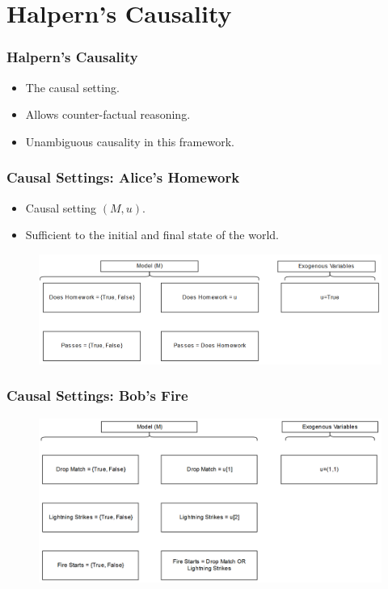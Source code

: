 \documentclass{beamer}
\theoremstyle{plain}
\theoremstyle{definition}
\begin{document}

\section{Halpern's Causality}


\begin{frame}
\frametitle{Halpern's Causality}

\begin{itemize}
\item The causal setting.
\item Allows counter-factual reasoning.
\item Unambiguous causality in this framework.

\end{itemize}

\end{frame}

\begin{frame}
\frametitle{Causal Settings: Alice's Homework}
\begin{itemize}
\item Causal setting $(M,u)$.
\item Sufficient to the initial and final state of the world.

\end{itemize}

\begin{figure}
\includegraphics[scale=0.3]{alicemodel}
\end{figure}
\end{frame}

\begin{frame}
\frametitle{Causal Settings: Bob's Fire}
\begin{figure}
\includegraphics[scale=0.3]{fireModel}
\end{figure}
\end{frame}
\end{document}
